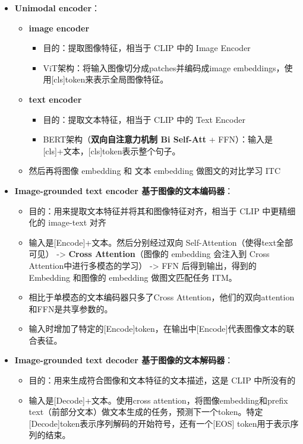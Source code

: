 \documentclass[zihao=false,fontset=windows]{ctexart}
\begin{document}
\begin{itemize}
\item \textbf{Unimodal encoder}：
\begin{itemize}
\item \textbf{image encoder }
\begin{itemize}
\item 目的：提取图像特征，\textcolor{feishuBlue}{相当于 CLIP 中的 Image Encoder}
\item ViT架构：将输入图像切分成patches并编码成image embeddings，使用[cls]token来表示全局图像特征。
\end{itemize}
\item \textbf{text encoder }
\begin{itemize}
\item 目的：提取文本特征，\textcolor{feishuBlue}{相当于 CLIP 中的 Text Encoder}
\item BERT架构（\textbf{双向自注意力机制 Bi Self-Att }+ FFN）：输入是[cls]+文本，[cls]token表示整个句子。
\end{itemize}
\item 然后再将图像 embedding 和 文本 embedding 做图文的对比学习 ITC
\end{itemize}
\item \textbf{Image-grounded text encoder 基于图像的文本编码器}：
\begin{itemize}
\item 目的：用来提取文本特征并将其和图像特征对齐，\textcolor{feishuBlue}{相当于 CLIP 中更精细化的 image-text 对齐}
\item 输入是[Encode]+文本。然后分别经过双向 Self-Attention（使得text全部可见） -> \textbf{Cross Attention}（图像的 embedding 会注入到 Cross Attention中进行多模态的学习） -> FFN 后得到输出，得到的 Embedding 和图像的 embedding 做图文匹配任务 ITM。
\item 相比于单模态的文本编码器只多了Cross Attention，他们的双向attention和FFN是共享参数的。
\item 输入时增加了特定的[Encode]token，在输出中[Encode]代表图像文本的联合表征。
\end{itemize}
\item \textbf{Image-grounded text decoder 基于图像的文本解码器}：
\begin{itemize}
\item 目的：用来生成符合图像和文本特征的文本描述，\textcolor{feishuBlue}{这是 CLIP 中所没有的}
\item 输入是[Decode]+文本。使用cross attention，将图像embedding和prefix text（前部分文本）做文本生成的任务，预测下一个token。特定[Decode]token表示序列解码的开始符号，还有一个[EOS] token用于表示序列的结束。

\end{itemize}
\end{itemize}
\end{document}
